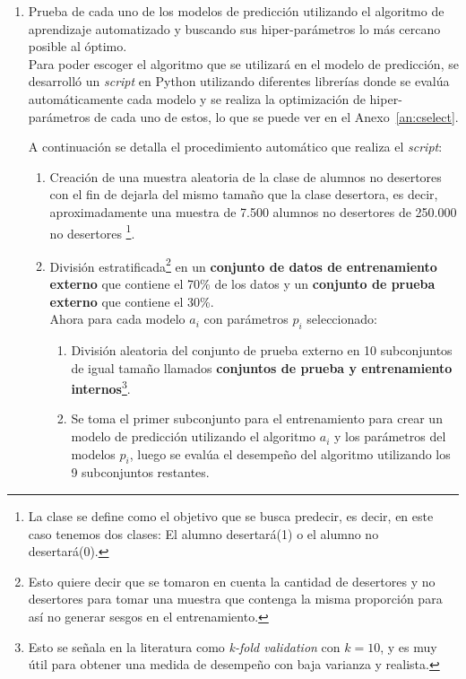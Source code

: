 \begin{enumerate}
\item Prueba de cada uno de los modelos de predicción utilizando el algoritmo de aprendizaje automatizado y buscando sus hiper-parámetros lo más cercano posible al óptimo. \\ \hfill
Para poder escoger el algoritmo que se utilizará en el modelo de predicción, se desarrolló un \textit{script} en Python utilizando diferentes librerías donde se evalúa automáticamente cada modelo y se realiza la optimización de hiper-parámetros de cada uno de estos, lo que se puede ver en el Anexo~\ref{an:cselect}.

A continuación se detalla el procedimiento automático que realiza el \textit{script}:\\
\begin{enumerate}
\item Creación de una muestra aleatoria de la clase de alumnos no desertores con el fin de dejarla del mismo tamaño que la clase desertora, es decir, aproximadamente una muestra de 7.500 alumnos no desertores de 250.000 no desertores \footnote{La clase se define como el objetivo que se busca predecir, es decir, en este caso tenemos dos clases: El alumno desertará(1) o el alumno no desertará(0).}.
\item División estratificada\footnote{Esto quiere decir que se tomaron en cuenta la cantidad de desertores y no desertores para tomar una muestra que contenga la misma proporción para así no generar sesgos en el entrenamiento.} en un \textbf{conjunto de datos de entrenamiento externo} que contiene el 70\% de los datos y un \textbf{conjunto de prueba externo} que contiene el 30\%.
\\ \hfill
Ahora para cada modelo $a_i$ con parámetros $p_i$ seleccionado:
    \begin{enumerate}
    \item División aleatoria del conjunto de prueba externo en 10 subconjuntos de igual tamaño llamados \textbf{conjuntos de prueba y entrenamiento internos}\footnote{Esto se señala en la literatura como \textit{k-fold validation} con $k = 10$, y es muy útil para obtener una medida de desempeño con baja varianza y realista.}.
    \item Se toma el primer subconjunto para el entrenamiento para crear un modelo de predicción utilizando el algoritmo $a_i$ y los parámetros del modelos $p_i$, luego se evalúa el desempeño del algoritmo utilizando los 9 subconjuntos restantes.

\end{enumerate}
\end{enumerate}
\end{enumerate}
